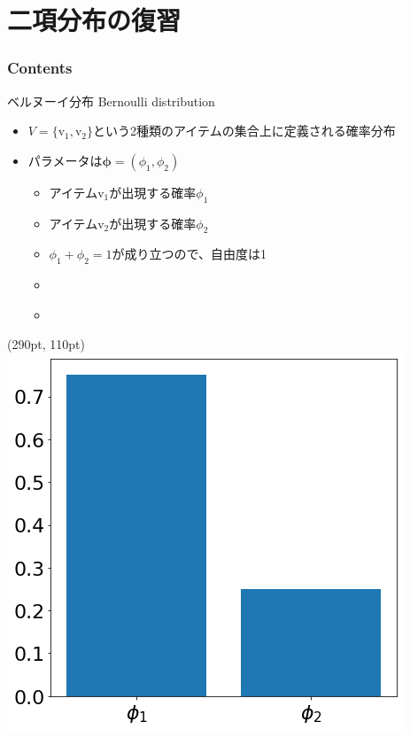 \documentclass[aspectratio=169,unicode,dvipdfmx,14pt]{beamer}
\begin{document}
\section{二項分布の復習}

\begin{frame}\frametitle{Contents}
\Large \tableofcontents[currentsection]
\end{frame}

\begin{frame}{ベルヌーイ分布 Bernoulli distribution}
\begin{itemize}
\item $V=\{\mbox{v}_1,\mbox{v}_2\}$という2種類のアイテムの集合上に定義される確率分布
\item パラメータは$\bm{\phi} = (\phi_1, \phi_2)$
\begin{itemize}
\item アイテム$\mbox{v}_1$が出現する確率$\phi_1$
\item アイテム$\mbox{v}_2$が出現する確率$\phi_2$
\item $\phi_1 + \phi_2=1$が成り立つので、自由度は1
\item[] \
\item[] \
\end{itemize}
\end{itemize}
\begin{textblock*}{0.4\linewidth}(290pt, 110pt)
    \centering
    \includegraphics[width=0.8\linewidth]{bernoulli}
\end{textblock*}
\end{frame}
\end{document}
